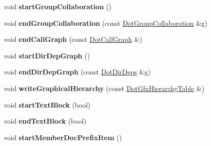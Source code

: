 \begin{DoxyCompactItemize}
\item 
\hypertarget{class_latex_generator_ac75e421f535cd69ad8b286bb5682f98a}{void {\bfseries start\-Group\-Collaboration} ()}\label{class_latex_generator_ac75e421f535cd69ad8b286bb5682f98a}

\item 
\hypertarget{class_latex_generator_abf4d1f5c7a6de661874865317e848973}{void {\bfseries end\-Group\-Collaboration} (const \hyperlink{class_dot_group_collaboration}{Dot\-Group\-Collaboration} \&g)}\label{class_latex_generator_abf4d1f5c7a6de661874865317e848973}

\item 
\hypertarget{class_latex_generator_a93d8bcfaeaaa615386cf736ad2f2259b}{void {\bfseries end\-Call\-Graph} (const \hyperlink{class_dot_call_graph}{Dot\-Call\-Graph} \&)}\label{class_latex_generator_a93d8bcfaeaaa615386cf736ad2f2259b}

\item 
\hypertarget{class_latex_generator_a071f06d58679ecf7077e1bb4335b798c}{void {\bfseries start\-Dir\-Dep\-Graph} ()}\label{class_latex_generator_a071f06d58679ecf7077e1bb4335b798c}

\item 
\hypertarget{class_latex_generator_a074b02c465c6db3a6252095c906511ab}{void {\bfseries end\-Dir\-Dep\-Graph} (const \hyperlink{class_dot_dir_deps}{Dot\-Dir\-Deps} \&g)}\label{class_latex_generator_a074b02c465c6db3a6252095c906511ab}

\item 
\hypertarget{class_latex_generator_a74e60d52299a8b1d0e08397d3d362f48}{void {\bfseries write\-Graphical\-Hierarchy} (const \hyperlink{class_dot_gfx_hierarchy_table}{Dot\-Gfx\-Hierarchy\-Table} \&)}\label{class_latex_generator_a74e60d52299a8b1d0e08397d3d362f48}

\item 
\hypertarget{class_latex_generator_ae8ef4194fc15fa0d64074879660110f0}{void {\bfseries start\-Text\-Block} (bool)}\label{class_latex_generator_ae8ef4194fc15fa0d64074879660110f0}

\item 
\hypertarget{class_latex_generator_a478d722be3ebb3a3c0974f9f840a80e8}{void {\bfseries end\-Text\-Block} (bool)}\label{class_latex_generator_a478d722be3ebb3a3c0974f9f840a80e8}

\item 
\hypertarget{class_latex_generator_a69e0980a62e287e8543cc10ac407483b}{void {\bfseries start\-Member\-Doc\-Prefix\-Item} ()}\label{class_latex_generator_a69e0980a62e287e8543cc10ac407483b}


\end{DoxyCompactItemize}
